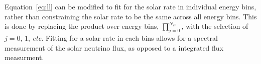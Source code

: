 Equation~\eqref{eq:ll} can be modified to fit for the solar rate in individual
energy bins, rather than constraining the solar rate to be the same across
all energy bins. This is done by replacing the product over energy bins,
$\prod_{j=0}^{N_E}$, with the selection of $j=0\text{, }1\text{, }$\textit{etc.}
Fitting for a solar rate in each bins allows for a spectral measurement of the
solar neutrino flux, as opposed to a integrated flux measurment.
